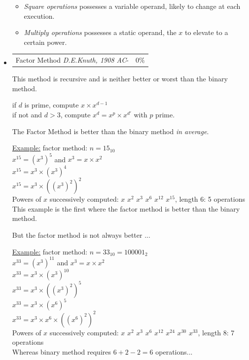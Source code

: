 \begin{itemize}
		\begin{itemize}
			\item \textit{Square operations} possesses a variable operand, likely to change at each execution.
			\item \textit{Multiply operations} possesses a static operand, the $x$ to elevate to a certain power.\\
		\end{itemize}

\item 	\begin{tabularx}{\linewidth}{ p{16cm} p{1.5cm}} 
		Factor Method
		\textit{D.E.Knuth, 1908 AC}-  & $0\%$ \\
		\end{tabularx}	
		This method is recursive and is neither better or worst than the binary method.

		if $d$ is prime, compute $x \times x^{d-1}$\\
		if not and $d>3$, compute $ x^d = x^p \times x^{d'}$ with $p$ prime.

		The Factor Method is better than the binary method \textit{in average}.

		\underline{Example:} factor method: $n=15_{10}$\\			
			$x^{15} = (x^{3})^{5}$ and $x^{3} = x \times x^{2}$\\
			$x^{15} = x^{3} \times (x^{3})^{4}$\\
			$x^{15} = x^{3} \times ((x^{3})^{2})^2$\\
			Powers of $x$ successively computed:
			$x$ $x^2$ $x^3$ $x^6$ $x^{12}$ $x^{15}$, length 6: 5 operations\\
			This example is the first where the factor method is better than the binary method.

			But the factor method is not always better ...

		\underline{Example:} factor method: $n=33_{10} = 100001_2$\\			
			$x^{33} = (x^{3})^{11}$ and $x^{3} = x \times x^{2}$\\
			$x^{33} = x^{3} \times (x^{3})^{10}$\\
			$x^{33} = x^{3} \times ((x^{3})^{2})^5$\\	
			$x^{33} = x^{3} \times (x^{6})^5$\\
			$x^{33} = x^{3} \times x^{6} \times ((x^{6})^{2})^2$\\
			Powers of $x$ successively computed:
			$x$ $x^2$ $x^3$ $x^6$ $x^{12}$ $x^{24}$ $x^{30}$ $x^{33}$, length 8: 7 operations\\
			Whereas binary method requires $6 + 2 - 2=6$ operations...	

\end{itemize}



